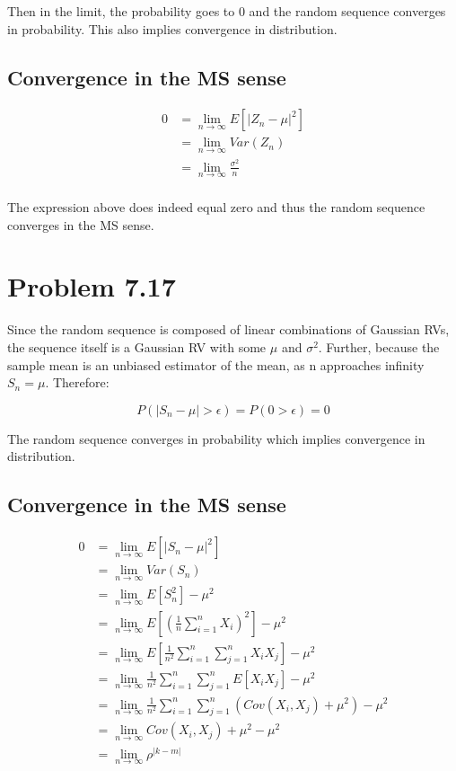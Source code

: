 \documentclass[12pt]{article}
\begin{document}
Then in the limit, the probability goes to 0 and the random sequence converges in
probability. This also implies convergence in distribution.

\subsection{Convergence in the MS sense}
\begin{align*}
  0 &= \lim_{n\to\infty} E\left[ |Z_n - \mu|^2 \right] \\
  &= \lim_{n\to\infty} Var(Z_n) \\
  &= \lim_{n\to\infty} \frac{\sigma^2}{n} \\
\end{align*}

The expression above does indeed equal zero and thus the random sequence converges in
the MS sense.

\section{Problem 7.17}

Since the random sequence is composed of linear combinations of Gaussian RVs, the 
sequence itself is a Gaussian RV with some $\mu$ and $\sigma^2$. Further, because
the sample mean is an unbiased estimator of the mean, as n approaches infinity
$S_n = \mu$. Therefore:

\[
  P(|S_n - \mu| > \epsilon) = P(0 > \epsilon) = 0
\]

The random sequence converges in probability which implies convergence in distribution.

\subsection{Convergence in the MS sense}
\begin{align*}
  0 &= \lim_{n\to\infty} E\left[ |S_n - \mu|^2 \right] \\
  &= \lim_{n\to\infty} Var(S_n) \\
  &= \lim_{n\to\infty} E[S_n^2] - \mu^2 \\
  &= \lim_{n\to\infty} E\left[\left(\frac{1}{n}\sum_{i=1}^n X_i\right)^2\right] - \mu^2 \\
  &= \lim_{n\to\infty} E\left[\frac{1}{n^2}\sum_{i=1}^n\sum_{j=1}^n X_iX_j\right] - \mu^2 \\
  &= \lim_{n\to\infty} \frac{1}{n^2}\sum_{i=1}^n\sum_{j=1}^n E\left[X_iX_j\right] - \mu^2 \\
  &= \lim_{n\to\infty} \frac{1}{n^2}\sum_{i=1}^n\sum_{j=1}^n \left(Cov(X_i,X_j) + \mu^2 \right) - \mu^2 \\
  &= \lim_{n\to\infty} Cov(X_i,X_j) + \mu^2 - \mu^2 \\
  &= \lim_{n\to\infty} \rho^{|k-m|}
\end{align*}
\end{document}

